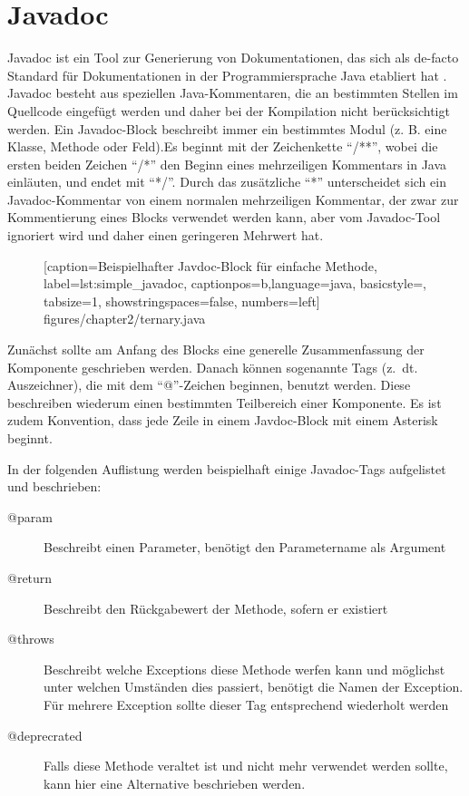 \section{Javadoc}\label{chapter:javadoc}
Javadoc \cite{HowtoWriteDocCommentsfortheJavadocTool} ist ein Tool zur Generierung von Dokumentationen, das sich als de-facto Standard für Dokumentationen in der Programmiersprache Java etabliert hat \cite[S. 249]{JavadocViolationsandTheirEvolutioninOpen-SourceSoftware}.  Javadoc besteht aus speziellen Java-Kommentaren, die an bestimmten Stellen im Quellcode eingefügt werden und daher bei der Kompilation nicht berücksichtigt werden. Ein Javadoc-Block beschreibt immer ein bestimmtes Modul (z. B. eine Klasse, Methode oder Feld).Es beginnt mit der Zeichenkette \enquote{/**}, wobei die ersten beiden Zeichen \enquote{/*} den Beginn eines mehrzeiligen Kommentars in Java einläuten, und endet mit \enquote{*/}. Durch das zusätzliche \enquote{*} unterscheidet sich ein Javadoc-Kommentar von einem normalen mehrzeiligen Kommentar, der zwar zur Kommentierung eines Blocks verwendet werden kann, aber vom Javadoc-Tool ignoriert wird und daher einen geringeren Mehrwert hat.
		\begin{figure}[ht!]
			
			[caption={Beispielhafter Javdoc-Block für einfache Methode},
			label={lst:simple_javadoc},
			captionpos=b,language=java, basicstyle=\footnotesize, tabsize=1, showstringspaces=false,  numbers=left]
			{figures/chapter2/ternary.java}
		\end{figure}
Zunächst sollte am Anfang des Blocks eine generelle Zusammenfassung der Komponente geschrieben werden. Danach können sogenannte Tags (z.~dt. Auszeichner), die mit dem \enquote{@}-Zeichen beginnen, benutzt werden. Diese beschreiben wiederum einen bestimmten Teilbereich einer Komponente. Es ist zudem Konvention, dass jede Zeile in einem Javdoc-Block mit einem Asterisk beginnt. 

In der folgenden Auflistung werden beispielhaft einige Javadoc-Tags aufgelistet und beschrieben:
\begin{description}
         \item[@param]  Beschreibt einen Parameter, benötigt den Parametername als Argument
         \item[@return]  Beschreibt den Rückgabewert der Methode, sofern er existiert 
         \item[@throws] Beschreibt welche Exceptions diese Methode werfen kann und möglichst unter welchen Umständen dies passiert, benötigt die Namen der Exception. Für mehrere Exception sollte dieser Tag entsprechend wiederholt werden 
         \item[@deprecrated] Falls diese Methode veraltet ist und nicht mehr verwendet werden sollte, kann hier eine Alternative beschrieben werden. 
        
\end{description}

